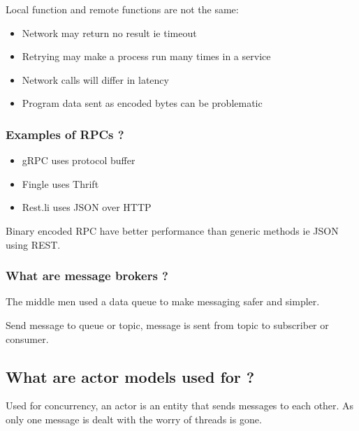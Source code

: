 \documentclass[11pt]{scrartcl} %
\begin{document}
Local function and remote functions are not the same:

\begin{itemize}
	\item Network may return no result ie timeout
	\item Retrying may make a process run many times in a service
	\item Network calls will differ in latency
	\item Program data sent as encoded bytes can be problematic
\end{itemize}

\subsubsection{Examples of RPCs ?}

\begin{itemize}
	\item gRPC uses protocol buffer
	\item Fingle uses Thrift
	\item Rest.li uses JSON over HTTP
\end{itemize}

Binary encoded RPC have better performance than generic methods ie JSON using REST.

\subsubsection{What are message brokers ?}

The middle men used a data queue to make messaging safer and simpler.

Send message to queue or topic, message is sent from topic to subscriber or consumer.

\subsection{What are actor models used for ?}

Used for concurrency, an actor is an entity that sends messages to each other. As only one message
is dealt with the worry of threads is gone.


\end{document}
